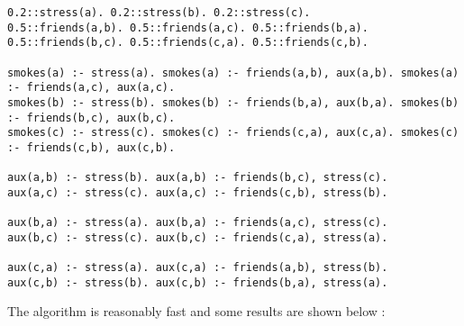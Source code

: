 \begin{code}
\begin{verbatim}
0.2::stress(a). 0.2::stress(b). 0.2::stress(c).
0.5::friends(a,b). 0.5::friends(a,c). 0.5::friends(b,a). 
0.5::friends(b,c). 0.5::friends(c,a). 0.5::friends(c,b).

smokes(a) :- stress(a). smokes(a) :- friends(a,b), aux(a,b). smokes(a) :- friends(a,c), aux(a,c).
smokes(b) :- stress(b). smokes(b) :- friends(b,a), aux(b,a). smokes(b) :- friends(b,c), aux(b,c).
smokes(c) :- stress(c). smokes(c) :- friends(c,a), aux(c,a). smokes(c) :- friends(c,b), aux(c,b).

aux(a,b) :- stress(b). aux(a,b) :- friends(b,c), stress(c).
aux(a,c) :- stress(c). aux(a,c) :- friends(c,b), stress(b).

aux(b,a) :- stress(a). aux(b,a) :- friends(a,c), stress(c).
aux(b,c) :- stress(c). aux(b,c) :- friends(c,a), stress(a).

aux(c,a) :- stress(a). aux(c,a) :- friends(a,b), stress(b).
aux(c,b) :- stress(b). aux(c,b) :- friends(b,a), stress(a).
\end{verbatim}
\label{code:base}
\vspace{0.5cm}
\end{code}

\par\noindent The algorithm is reasonably fast and some results are shown below :


